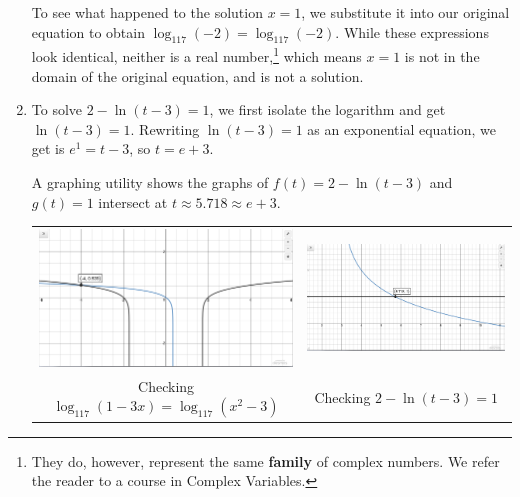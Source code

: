 \documentclass{ximera}
\begin{document}
\begin{ex}
\begin{enumerate}
\smallskip

To see what happened to the solution $x=1$, we substitute it into our original equation to obtain  $\log_{117}(-2) =  \log_{117}(-2)$.  While these expressions look identical, neither is a real number,\footnote{They do, however, represent the same \textbf{family} of complex numbers.  We refer the reader to a course in Complex Variables.} which means $x=1$ is not in the domain of the original equation, and is not a solution.    


\item  To solve  $2 - \ln(t-3) = 1$, we first isolate the logarithm and get $\ln(t-3) = 1$. Rewriting $\ln(t-3) = 1$ as an exponential equation, we get is $e^{1} = t-3$, so $t =e+3$. 

\smallskip

A graphing utility shows the graphs of $f(t) = 2 - \ln(t-3)$ and $g(t) = 1$ intersect at $t \approx   5.718 \approx e+3$.

\begin{center}

\begin{tabular}{cc}

\includegraphics[width=3in]{./LogarithmicEquationsandInequalitiesGraphics/LogEqnEx01.jpg} &

\includegraphics[width=3in]{./LogarithmicEquationsandInequalitiesGraphics/LogEqnEx02.jpg}  \\

Checking $\log_{117}(1-3x) = \log_{117}\left(x^2-3\right)$
 
 &
 
 Checking $2 - \ln(t-3) = 1$
 
\end{tabular}


\end{center}
\end{enumerate}
\end{ex}
\end{document}
